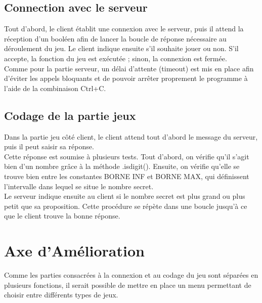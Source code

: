 \documentclass[12pt,a4paper]{article}
\begin{document}
\subsection{Connection avec le serveur}
Tout d’abord, le client établit une connexion avec le serveur, puis il attend la réception d’un booléen afin de lancer la boucle de réponse nécessaire au déroulement du jeu. Le client indique ensuite s’il souhaite jouer ou non. S’il accepte, la fonction du jeu est exécutée ; sinon, la connexion est fermée.\\
Comme pour la partie serveur, un délai d’attente (timeout) est mis en place afin d’éviter les appels bloquants et de pouvoir arrêter proprement le programme à l’aide de la combinaison Ctrl+C.

\subsection{Codage de la partie jeux}
Dans la partie jeu côté client, le client attend tout d’abord le message du serveur, puis il peut saisir sa réponse.\\
Cette réponse est soumise à plusieurs tests. Tout d’abord, on vérifie qu’il s’agit bien d’un nombre grâce à la méthode .isdigit(). Ensuite, on vérifie qu’elle se trouve bien entre les constantes BORNE INF et BORNE MAX, qui définissent l’intervalle dans lequel se situe le nombre secret.\\
Le serveur indique ensuite au client si le nombre secret est plus grand ou plus petit que sa proposition. Cette procédure se répète dans une boucle jusqu’à ce que le client trouve la bonne réponse.

\section{Axe d'Amélioration}
Comme les parties consacrées à la connexion et au codage du jeu sont séparées en plusieurs fonctions, il serait possible de mettre en place un menu permettant de choisir entre différents types de jeux.
\end{document}

